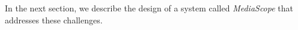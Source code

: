 

In the next section, we describe the design of a system called
\emph{MediaScope} that addresses these challenges.



